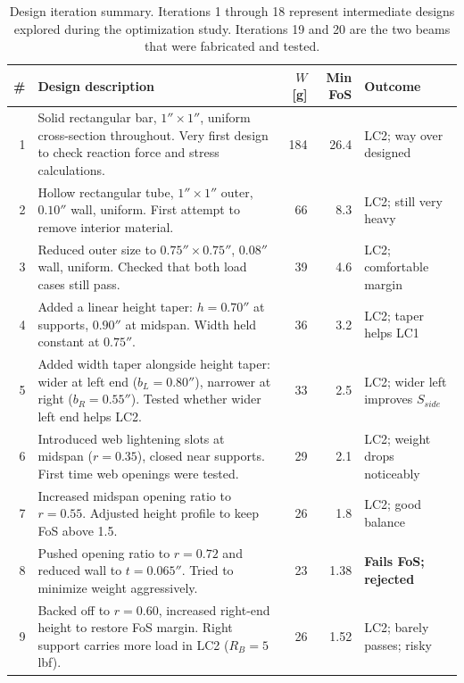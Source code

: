 \documentclass[11pt,letterpaper]{article}
\begin{document}
\begin{table}[H]
\centering
\caption{Design iteration summary.  Iterations 1 through 18 represent
intermediate designs explored during the optimization study.
Iterations 19 and 20 are the two beams that were fabricated and tested.}
\label{tab:iterations}
\small
\begin{tabular}{rp{7.5cm}rrl}
\toprule
\# & Design description & $W$ [g] & Min FoS & Outcome \\
\midrule
1  & Solid rectangular bar, $1''\times 1''$, uniform cross-section throughout.
     Very first design to check reaction force and stress calculations.
   & 184 & 26.4 & LC2; way over designed \\[2pt]

2  & Hollow rectangular tube, $1''\times 1''$ outer, $0.10''$ wall, uniform.
     First attempt to remove interior material.
   & 66 & 8.3 & LC2; still very heavy \\[2pt]

3  & Reduced outer size to $0.75''\times 0.75''$, $0.08''$ wall, uniform.
     Checked that both load cases still pass.
   & 39 & 4.6 & LC2; comfortable margin \\[2pt]

4  & Added a linear height taper: $h = 0.70''$ at supports, $0.90''$ at midspan.
     Width held constant at $0.75''$.
   & 36 & 3.2 & LC2; taper helps LC1 \\[2pt]

5  & Added width taper alongside height taper: wider at left end ($b_L = 0.80''$),
     narrower at right ($b_R = 0.55''$).  Tested whether wider left end helps LC2.
   & 33 & 2.5 & LC2; wider left improves $S_{side}$ \\[2pt]

6  & Introduced web lightening slots at midspan ($r = 0.35$), closed near supports.
     First time web openings were tested.
   & 29 & 2.1 & LC2; weight drops noticeably \\[2pt]

7  & Increased midspan opening ratio to $r = 0.55$.  Adjusted height profile
     to keep FoS above 1.5.
   & 26 & 1.8 & LC2; good balance \\[2pt]

8  & Pushed opening ratio to $r = 0.72$ and reduced wall to $t = 0.065''$.
     Tried to minimize weight aggressively.
   & 23 & 1.38 & \textbf{Fails FoS; rejected} \\[2pt]

9  & Backed off to $r = 0.60$, increased right-end height to restore FoS margin.
     Right support carries more load in LC2 ($R_B = 5$ lbf).
   & 26 & 1.52 & LC2; barely passes; risky \\[2pt]


\end{tabular}
\end{table}
\end{document}
